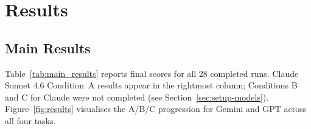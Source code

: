 \documentclass[conference]{IEEEtran}
\begin{document}
\section{Results}

\subsection{Main Results}

Table~\ref{tab:main_results} reports final scores for all 28 completed runs.
Claude Sonnet 4.6 Condition~A results appear in the rightmost column; Conditions
B and C for Claude were not completed (see Section~\ref{sec:setup-models}).
Figure~\ref{fig:results} visualises the A/B/C progression for Gemini and GPT
across all four tasks.
\end{document}

